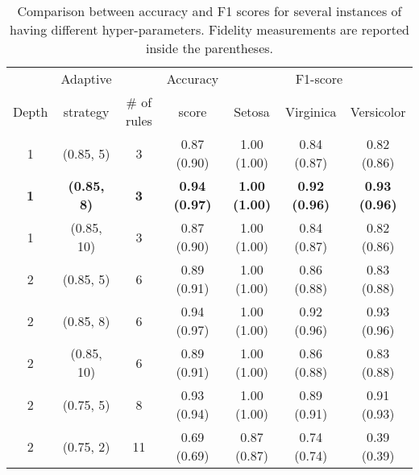 
\begin{table}
	\caption{Comparison between accuracy and F1 scores for several instances of \gridex{} having different hyper-parameters. Fidelity measurements are reported inside the parentheses.}
	\label{tab:gridex}
	\begin{tabular}{c|c|c|c|ccc}
		\toprule
		& Adaptive & & Accuracy & \multicolumn{3}{c}{F1-score}\\
 		Depth & strategy & \# of rules & score & Setosa & Virginica & Versicolor \\
		\midrule
		1 & (0.85, 5) & 3 & 0.87 (0.90) & 1.00 (1.00) & 0.84 (0.87) & 0.82 (0.86) \\
		\textbf{1} & \textbf{(0.85, 8)} & \textbf{3} & \textbf{0.94 (0.97)} & \textbf{1.00 (1.00)} & \textbf{0.92 (0.96)} & \textbf{0.93 (0.96)} \\
		1 & (0.85, 10) & 3 & 0.87 (0.90) & 1.00 (1.00) & 0.84 (0.87) & 0.82 (0.86) \\
		2 & (0.85, 5) & 6 & 0.89 (0.91) & 1.00 (1.00) & 0.86 (0.88) & 0.83 (0.88) \\
		2 & (0.85, 8) & 6 & 0.94 (0.97) & 1.00 (1.00) & 0.92 (0.96) & 0.93 (0.96) \\
		2 & (0.85, 10) & 6 & 0.89 (0.91) & 1.00 (1.00) & 0.86 (0.88) & 0.83 (0.88) \\
		2 & (0.75, 5) & 8 & 0.93 (0.94) & 1.00 (1.00) & 0.89 (0.91) & 0.91 (0.93) \\
		2 & (0.75, 2) & 11 & 0.69 (0.69) & 0.87 (0.87) & 0.74 (0.74) & 0.39 (0.39) \\
		\bottomrule
	\end{tabular}
\end{table}
